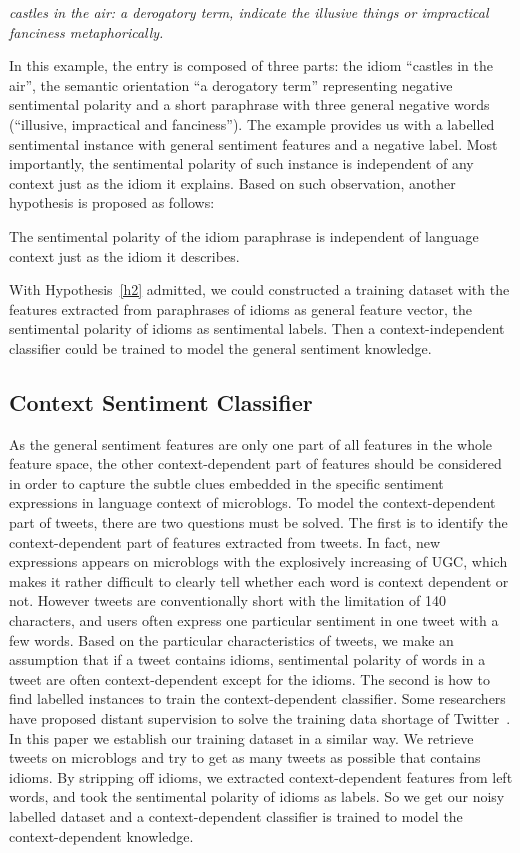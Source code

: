 \documentclass{llncs}
\begin{document}
\textit{castles in the air: a derogatory term, indicate the illusive things or impractical fanciness metaphorically.}

In this example, the entry is composed of three parts: the idiom ``castles in the air'', the semantic orientation ``a derogatory term'' representing negative
sentimental polarity and a short paraphrase with three general negative words (``illusive, impractical and fanciness''). 
The example provides us with a labelled sentimental instance with general sentiment features and a negative label.
Most importantly, the sentimental polarity of such instance is independent of any context just as the idiom it explains. 
Based on such observation, another hypothesis is proposed as follows:
\begin{hypothesis}
\label{h2}
The sentimental polarity of the idiom paraphrase is independent of language context just as the idiom it describes.
\end{hypothesis}
With Hypothesis~\ref{h2} admitted, we could constructed a training dataset with the features extracted from paraphrases of idioms as general feature vector, the sentimental polarity of idioms as sentimental labels. 
Then a context-independent classifier could be trained to model the general sentiment knowledge.
\subsection{Context Sentiment Classifier}
\label{context}
As the general sentiment features are only one part of all features in the whole feature space, the other context-dependent part of features should be considered in order to capture the subtle clues embedded in the specific sentiment expressions in language context of microblogs.
To model the context-dependent part of tweets, there are two questions must be solved. 
The first is to identify the context-dependent part of features extracted from tweets. 
In fact, new expressions appears on microblogs with the explosively increasing of UGC, which makes it rather difficult to clearly tell whether each word is context dependent or not. 
However tweets are conventionally short with the limitation of 140 characters, and users often express one particular sentiment in one tweet with a few words. 
Based on the particular characteristics of tweets, we make an assumption that if a tweet contains idioms,  sentimental polarity of words in a tweet are often context-dependent except for the idioms. 
The second is how to find labelled instances to train the context-dependent classifier. 
Some researchers have proposed distant supervision to solve the training data shortage of Twitter~\cite{xsongx:b36,xsongx:b37}. 
In this paper we establish our training dataset in a similar way.
We retrieve tweets on microblogs and try to get as many tweets as possible that contains idioms. 
By stripping off idioms, we extracted context-dependent features from left words, and took the sentimental polarity of idioms as labels. 
So we get our noisy labelled dataset and a context-dependent classifier is trained to model the context-dependent knowledge.
\end{document}
